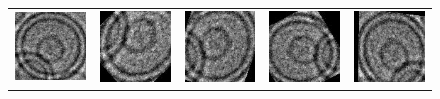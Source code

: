 \documentclass[a4paper, 11pt, table]{article}
\begin{document}
\begin{figure}[H]
\centering
\begin{tabular}{ccccc}
\includegraphics[scale=0.5]{augmented/541253.jpg} & \includegraphics[scale=0.5]{augmented/_0_645.jpeg} & \includegraphics[scale=0.5]{augmented/_0_1385.jpeg} & \includegraphics[scale=0.5]{augmented/_0_1749.jpeg} & \includegraphics[scale=0.5]{augmented/_0_2343.jpeg} \\


\end{tabular}
\end{figure}
\end{document}
